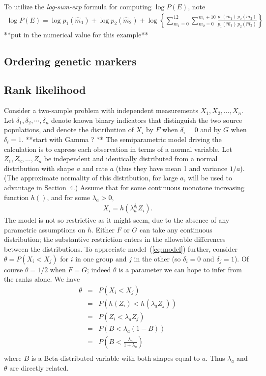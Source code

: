 To utilize the {\em log-sum-exp} formula for computing $\log P(E)$, 
note
\begin{eqnarray*}
\log P(E) = \log p_1(\hat m_1) + \log p_2( \hat m_2 )
  + \log \left\{
     \sum_{m_1 = 0}^{12} \sum_{m_2=0}^{m_1+10}
     \frac{ p_1(m_1) \, p_2(m_2)  }{ p_1( \hat m_1 ) \, p_2 (\hat m_2 ) }
    \right\}
\end{eqnarray*}
**put in the numerical value for this example**

\subsection{Ordering genetic markers}

\subsection{Rank likelihood}
 

Consider a two-sample problem with independent measurements
 $X_1, X_2, \ldots, X_n$.  Let $\delta_1, \delta_2, \cdots, \delta_n$ 
 denote known binary indicators that distinguish the two source populations,
 and denote 
 the distribution of $X_i$ by $F$ when $\delta_i=0$ and by $G$ when 
 $\delta_i=1$.
 **start with Gamma ? **
 The semiparametric model driving the calculation is to express each observation
 in terms of a normal variable.  Let $Z_1, Z_2, \ldots, Z_n$
 be independent and identically distributed from a normal distribution with
 shape $a$ and rate $a$ (thus they have mean 1 and variance $1/a$).  (The
 approximate normality of this distribution, for large $a$, will be used
 to advantage in Section~4.)  
 Assume that for some continuous monotone increasing function $h()$, and
 for some $\lambda_a > 0 $,
 \begin{eqnarray}
\label{eq:model}
  X_i = h\left( \lambda_a^{ \delta_i } Z_i \right).
 \end{eqnarray}
The model is not so restrictive as it might seem, due to the absence
of any parametric assumptions on $h$.  Either $F$ or $G$ can take any
continuous distribution; the substantive restriction enters in the allowable
differences between the distributions.  To appreciate model~(\ref{eq:model}) 
further, consider $\theta = P( X_i < X_j )$ for $i$ in one group and $j$ in the other
(so $\delta_i=0$ and $\delta_j=1$).  Of course $\theta= 1/2$ when $F=G$; indeed
 $\theta$ is a parameter we can hope to infer from the ranks alone. We have
\begin{eqnarray}
\label{eq:theta}
 \theta &=& P(X_i < X_j) \\ \nonumber
        &=& P\left( h( Z_i ) < h( \lambda_a Z_j )    \right) \\ \nonumber
         &=& P\left( Z_i < \lambda_a Z_j \right) \\ \nonumber
         &=& P\left(  B < \lambda_a (1-B) \right) \\ \nonumber
         &=& P\left( B <  \frac{ \lambda_a }{ 1 + \lambda_a } \right) \\ \nonumber
\end{eqnarray}
where $B$ is a Beta-distributed variable with both shapes equal to $a$.
Thus  $\lambda_a$ and $\theta$ are directly related.

